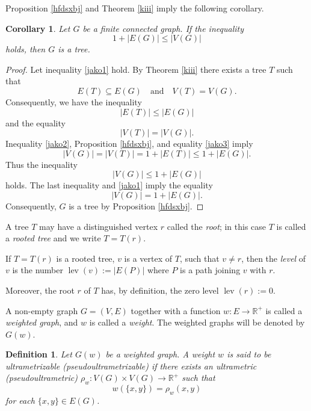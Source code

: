 \documentclass[pdflatex,sn-mathphys-num]{sn-jnl}%
\theoremstyle{thmstyleone}%
\newtheorem{Corollary}[Theorem]{Corollary}
\theoremstyle{thmstyletwo}%
\theoremstyle{thmstylethree}%
\newtheorem{Definition}[Theorem]{Definition}
\theoremstyle{thmstyletwo}%
\theoremstyle{thmstylethree}%
\begin{document}
Proposition \ref{hfdsxbj} and Theorem \ref{kiii} imply the following corollary.

\begin{Corollary}\label{letp} Let $G$ be a finite connected graph. If the inequality
\begin{equation}
    \label{jako1}
1 + |E(G)| \le |V(G)|
\end{equation}
holds, then $G$ is a tree.
\end{Corollary}

\begin{proof}
Let inequality \eqref{jako1} hold. By Theorem \ref{kiii} there exists a tree $T$ such that
\[
E(T) \subseteq E(G) \quad \text{and} \quad V(T) = V(G).
\]
Consequently, we have the inequality
\begin{equation}
    \label{jako2}
|E(T)| \le |E(G)| 
\end{equation}
and the equality
\begin{equation}
    \label{jako3}
|V(T)| = |V(G)|. 
\end{equation}
Inequality \eqref{jako2}, Proposition \ref{hfdsxbj}, and equality \eqref{jako3} imply
\[
|V(G)| = |V(T)| = 1 + |E(T)| \le 1 + |E(G)|.
\]
Thus the inequality
\[
|V(G)| \le 1 + |E(G)|
\]
holds. The last inequality and \eqref{jako1} imply the equality
\[
|V(G)| = 1 + |E(G)|.
\]
Consequently, $G$ is a tree by Proposition \ref{hfdsxbj}.
\end{proof}



A tree $T$ may have a distinguished vertex $r$ called the {\it root}; in this case $T$ is called a {\it rooted tree} and we write $T=T(r)$.



If $T = T(r)$ is a rooted tree, $v$ is a vertex of $T$, such that $v \neq r$, 
then the {\it level} of $v$ is the number $\operatorname{lev}(v):=|E(P)|$ where $P$ is a path joining $v$ with $r$.


Moreover, the root $r$ of $T$ has, by definition,  the zero level $\operatorname{lev}(r):=0$.




 A non-empty graph $G=(V,E)$ together with a function $w:E\to \mathbb{R}^+$ is called a {\it weighted graph}, and $w$ is called a {\it weight}. The weighted graphs will be denoted by $G(w)$.





\begin{Definition} Let $G(w)$ be a weighted graph.  A weight $w$ is said to be {\it ultrametrizable (pseudoultrametrizable)} if there exists an ultrametric (pseudoultrametric) $\rho_w : V(G) \times V(G) \to \mathbb{R}^+$ such that 
\begin{equation}
\label{kaske}
    w(\{x,y\})=\rho_w(x,y)
\end{equation}
 for each $\{x,y\} \in E(G)$.
\end{Definition}
\end{document}
